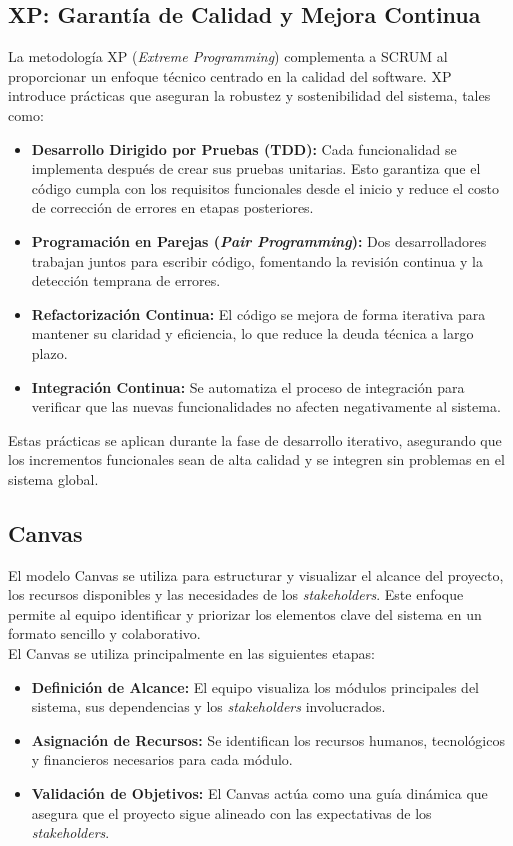 \documentclass[conference]{IEEEtran}
\begin{document}
\subsection{XP: Garantía de Calidad y Mejora Continua}
La metodología XP (\textit{Extreme Programming}) complementa a SCRUM al proporcionar un enfoque técnico centrado en la calidad del software. XP introduce prácticas que aseguran la robustez y sostenibilidad del sistema, tales como:
\begin{itemize}
    \item \textbf{Desarrollo Dirigido por Pruebas (TDD):} Cada funcionalidad se implementa después de crear sus pruebas unitarias. Esto garantiza que el código cumpla con los requisitos funcionales desde el inicio y reduce el costo de corrección de errores en etapas posteriores.
    \item \textbf{Programación en Parejas (\textit{Pair Programming}):} Dos desarrolladores trabajan juntos para escribir código, fomentando la revisión continua y la detección temprana de errores.
    \item \textbf{Refactorización Continua:} El código se mejora de forma iterativa para mantener su claridad y eficiencia, lo que reduce la deuda técnica a largo plazo.
    \item \textbf{Integración Continua:} Se automatiza el proceso de integración para verificar que las nuevas funcionalidades no afecten negativamente al sistema.
\end{itemize}
Estas prácticas se aplican durante la fase de desarrollo iterativo, asegurando que los incrementos funcionales sean de alta calidad y se integren sin problemas en el sistema global.\\

\subsection{Canvas}

El modelo Canvas se utiliza para estructurar y visualizar el alcance del proyecto, los recursos disponibles y las necesidades de los \textit{stakeholders}. Este enfoque permite al equipo identificar y priorizar los elementos clave del sistema en un formato sencillo y colaborativo.\\

El Canvas se utiliza principalmente en las siguientes etapas:
\begin{itemize}
    \item \textbf{Definición de Alcance:} El equipo visualiza los módulos principales del sistema, sus dependencias y los \textit{stakeholders} involucrados.
    \item \textbf{Asignación de Recursos:} Se identifican los recursos humanos, tecnológicos y financieros necesarios para cada módulo.
    \item \textbf{Validación de Objetivos:} El Canvas actúa como una guía dinámica que asegura que el proyecto sigue alineado con las expectativas de los \textit{stakeholders}.\\
\end{itemize}
\end{document}
